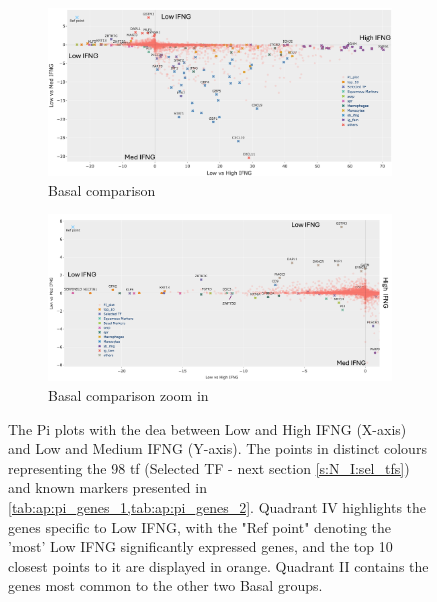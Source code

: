 \begin{figure}[H]
    \centering
    \begin{subfigure}[!t]{1.0\textwidth}
        \includegraphics[width=\textwidth,keepaspectratio]{Sections/ClusteringAnalysis/Resources/discussion/basal_comp_pi.png}    
        \caption{Basal comparison}
        \label{fig:cs:basal_comp}
    \end{subfigure}
    \centering
    \begin{subfigure}[!t]{1.0\textwidth}
        \includegraphics[width=\textwidth, keepaspectratio]{Sections/ClusteringAnalysis/Resources/discussion/basal_comp_pi_zoom.png}
        \caption{Basal comparison zoom in}
        \label{fig:cs:basal_comp_zoom}
    \end{subfigure} 
    \centering
    \caption[Pi-plot show the DEA comparisons between Basal groups]{The Pi plots with the \acrshort{dea} between Low and High IFNG (X-axis) and Low and Medium IFNG (Y-axis). The points in distinct colours representing the 98 \acrlong{tf} (Selected TF - next section \cref{s:N_I:sel_tfs}) and known markers presented in \cref{tab:ap:pi_genes_1,tab:ap:pi_genes_2}. Quadrant IV highlights the genes specific to Low IFNG, with the "Ref point" denoting the 'most' Low IFNG significantly expressed genes, and the top 10 closest points to it are displayed in orange. Quadrant II contains the genes most common to the other two Basal groups.}
    \label{fig:cs:pi_basal}
\end{figure}

